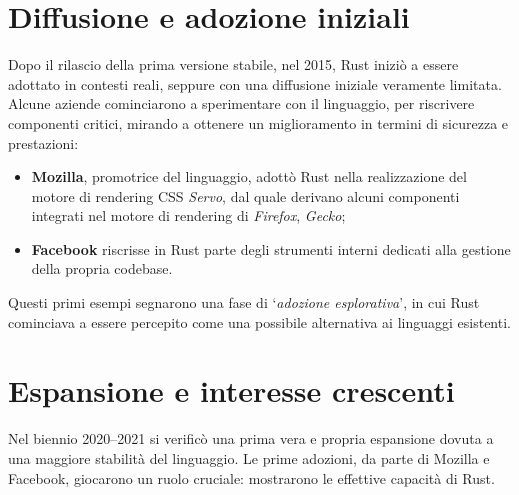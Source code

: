 \section{Diffusione e adozione iniziali}
Dopo il rilascio della prima versione stabile, nel 2015, Rust iniziò a essere adottato in contesti reali, seppure con una
diffusione iniziale veramente limitata. Alcune aziende cominciarono a sperimentare con il linguaggio, per riscrivere
componenti critici, mirando a ottenere un miglioramento in termini di sicurezza e prestazioni:
\begin{itemize}
    \item \textbf{Mozilla}, promotrice del linguaggio, adottò Rust nella realizzazione del motore di rendering CSS \textit{Servo}, dal quale derivano alcuni componenti integrati nel motore di rendering di \textit{Firefox}, \textit{Gecko};
    \item \textbf{Facebook} riscrisse in Rust parte degli strumenti interni dedicati alla gestione della propria codebase.
\end{itemize}
Questi primi esempi segnarono una fase di `\textit{adozione esplorativa}', in cui Rust cominciava a essere percepito come una 
possibile alternativa ai linguaggi esistenti.

\section{Espansione e interesse crescenti}
Nel biennio 2020--2021 si verificò una prima vera e propria espansione dovuta a una maggiore stabilità del linguaggio. Le prime adozioni, 
da parte di Mozilla e Facebook, giocarono un ruolo cruciale: mostrarono le effettive capacità di Rust.

